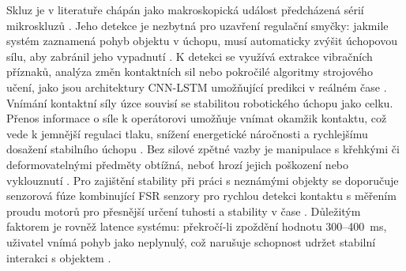Skluz je v literatuře chápán jako makroskopická událost předcházená sérií mikroskluzů \cite{Begalinova2020}. Jeho detekce je nezbytná pro uzavření regulační smyčky: jakmile systém zaznamená pohyb objektu v úchopu, musí automaticky zvýšit úchopovou sílu, aby zabránil jeho vypadnutí \cite{Begalinova2020, Xu2025}. K detekci se využívá extrakce vibračních příznaků, analýza změn kontaktních sil nebo pokročilé algoritmy strojového učení, jako jsou architektury CNN-LSTM umožňující predikci v reálném čase \cite{Xu2025, GIUDICI2025}.
Vnímání kontaktní síly úzce souvisí se stabilitou robotického úchopu jako celku. Přenos informace o síle k operátorovi umožňuje vnímat okamžik kontaktu, což vede k jemnější regulaci tlaku, snížení energetické náročnosti a rychlejšímu dosažení stabilního úchopu \cite{Papakonstantinou20251218, Thomas2023110}. Bez silové zpětné vazby je manipulace s křehkými či deformovatelnými předměty obtížná, neboť hrozí jejich poškození nebo vyklouznutí \cite{Park2022, DAbbraccio201923, GIUDICI2025}. Pro zajištění stability při práci s neznámými objekty se doporučuje senzorová fúze kombinující FSR senzory pro rychlou detekci kontaktu s měřením proudu motorů pro přesnější určení tuhosti a stability v čase \cite{Mohammadi2024418}. Důležitým faktorem je rovněž latence systému: překročí-li zpoždění hodnotu 300–400~ms, uživatel vnímá pohyb jako neplynulý, což narušuje schopnost udržet stabilní interakci s objektem \cite{Bolarinwa2022}.

